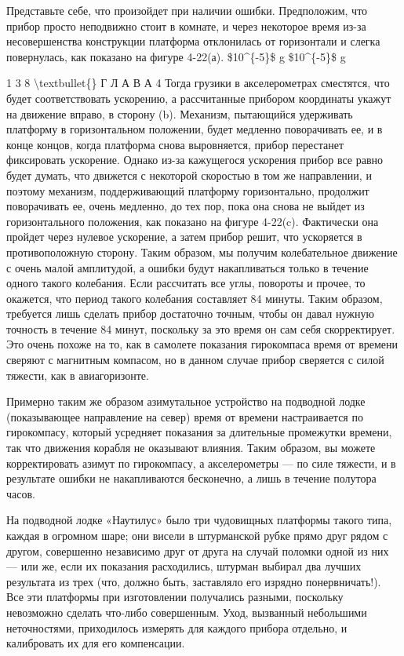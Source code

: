 \documentclass[10pt,oneside]{article}
\begin{document}
Представьте себе, что произойдет при наличии ошибки. Предположим, что прибор просто неподвижно стоит в комнате, и через некоторое время из-за несовершенства конструкции платформа отклонилась от горизонтали и слегка повернулась, как показано на фигуре 4-22(а). \$10\textasciicircum{}\{-5\}\$ g \$10\textasciicircum{}\{-5\}\$ g\par

1 3 8 \textbackslash{}textbullet\{\} Г Л А В А  4 Тогда грузики в акселерометрах сместятся, что будет соответствовать ускорению, а рассчитанные прибором координаты укажут на движение вправо, в сторону (b). Механизм, пытающийся удерживать платформу в горизонтальном положении, будет медленно поворачивать ее, и в конце концов, когда платформа снова выровняется, прибор перестанет фиксировать ускорение. Однако из-за кажущегося ускорения прибор все равно будет думать, что движется с некоторой скоростью в том же направлении, и поэтому механизм, поддерживающий платформу горизонтально, продолжит поворачивать ее, очень медленно, до тех пор, пока она снова не выйдет из горизонтального положения, как показано на фигуре 4-22(c). Фактически она пройдет через нулевое ускорение, а затем прибор решит, что ускоряется в противоположную сторону. Таким образом, мы получим колебательное движение с очень малой амплитудой, а ошибки будут накапливаться только в течение одного такого колебания. Если рассчитать все углы, повороты и прочее, то окажется, что период такого колебания составляет 84 минуты. Таким образом, требуется лишь сделать прибор достаточно точным, чтобы он давал нужную точность в течение 84 минут, поскольку за это время он сам себя скорректирует. Это очень похоже на то, как в самолете показания гирокомпаса время от времени сверяют с магнитным компасом, но в данном случае прибор сверяется с силой тяжести, как в авиагоризонте.\par

Примерно таким же образом азимутальное устройство на подводной лодке (показывающее направление на север) время от времени настраивается по гирокомпасу, который усредняет показания за длительные промежутки времени, так что движения корабля не оказывают влияния. Таким образом, вы можете корректировать азимут по гирокомпасу, а акселерометры --- по силе тяжести, и в результате ошибки не накапливаются бесконечно, а лишь в течение полутора часов.\par

На подводной лодке «Наутилус» было три чудовищных платформы такого типа, каждая в огромном шаре; они висели в штурманской рубке прямо друг рядом с другом, совершенно независимо друг от друга на случай поломки одной из них --- или же, если их показания расходились, штурман выбирал два лучших результата из трех (что, должно быть, заставляло его изрядно понервничать!). Все эти платформы при изготовлении получались разными, поскольку невозможно сделать что-либо совершенным. Уход, вызванный небольшими неточностями, приходилось измерять для каждого прибора отдельно, и калибровать их для его компенсации.\par
\end{document}
